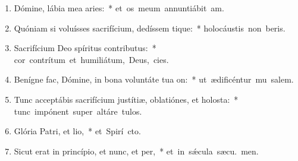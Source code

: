 \begin{flushleft}
\begin{enumerate}[leftmargin=*]
\item Dómine, lábia mea aries:~* \mbox{et os meum annuntiábit  am.}
\item Quóniam si voluísses sacrifícium, dedíssem tique:~* \mbox{holocáustis non beris.}
\item Sacrifícium Deo spíritus contributus:~* \mbox{cor contrítum et humiliátum, Deus,  cies.}
\item Benígne fac, Dómine, in bona voluntáte tua on:~* \mbox{ut ædificéntur mu salem.}
\item Tunc acceptábis sacrifícium justítiæ, oblatiónes, et holosta:~* \mbox{tunc impónent super altáre  tulos.}
\item Glória Patri, et lio,~* \mbox{et Spirí cto.}
\item Sicut erat in princípio, et nunc, et per,~* \mbox{et in s\'{\ae}cula sæcu. men.}

\end{enumerate}
\end{flushleft}


